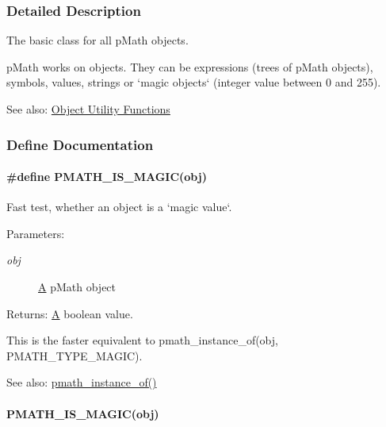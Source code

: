 \subsubsection{Detailed Description}
The basic class for all pMath objects. 

pMath works on objects. They can be expressions (trees of pMath objects), symbols, values, strings or `magic objects` (integer value between 0 and 255).

\begin{Desc}
\item[See also:]\hyperlink{group__helpers}{Object Utility Functions} \end{Desc}


\subsubsection{Define Documentation}
\hypertarget{group__objects_g6251ebcdaf2f71e5db906a65a8efa621}{
\paragraph[{PMATH\_\-IS\_\-MAGIC}]{\setlength{\rightskip}{0pt plus 5cm}\#define PMATH\_\-IS\_\-MAGIC(obj)}\hfill}
\label{group__objects_g6251ebcdaf2f71e5db906a65a8efa621}


Fast test, whether an object is a `magic value`. 

\begin{Desc}
\item[Parameters:]
\begin{description}
\item[{\em obj}]\hyperlink{class_a}{A} pMath object \end{description}
\end{Desc}
\begin{Desc}
\item[Returns:]\hyperlink{class_a}{A} boolean value.\end{Desc}
This is the faster equivalent to pmath\_\-instance\_\-of(obj, PMATH\_\-TYPE\_\-MAGIC).

\begin{Desc}
\item[See also:]\hyperlink{classpmath__t_0bd527f1ec2db8f1eba58e1fd84babbc}{pmath\_\-instance\_\-of()} \end{Desc}
\hypertarget{group__objects_gfa4048bca71f5022d1fb979a5b930a11}{
\paragraph[{PMATH\_\-IS\_\-MAGIC}]{\setlength{\rightskip}{0pt plus 5cm}PMATH\_\-IS\_\-MAGIC(obj)}\hfill}
\label{group__objects_gfa4048bca71f5022d1fb979a5b930a11}


